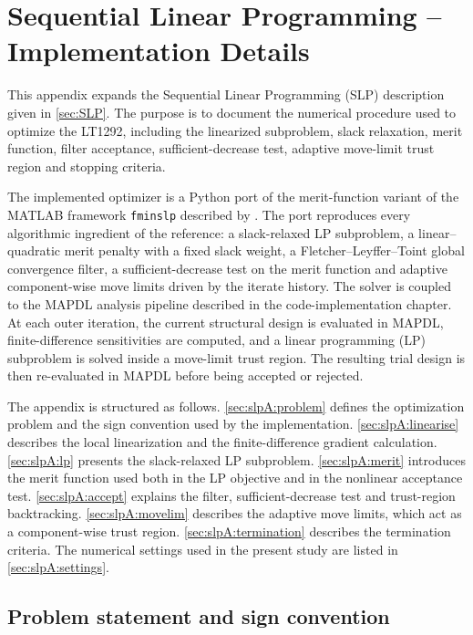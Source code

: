 \chapter{Sequential Linear Programming -- Implementation Details}
\label{sec:SLP_appendix}

This appendix expands the Sequential Linear Programming (SLP)
description given in \autoref{sec:SLP}. The purpose is to
document the numerical procedure used to optimize the LT1292,
including the linearized subproblem, slack relaxation, merit
function, filter acceptance, sufficient-decrease test, adaptive
move-limit trust region and stopping criteria.

The implemented optimizer is a Python port of the merit-function
variant of the MATLAB framework \texttt{fminslp} described by
\cite{sorensen2026fminslp}. The port reproduces every algorithmic
ingredient of the reference: a slack-relaxed LP subproblem, a
linear--quadratic merit penalty with a fixed slack weight, a
Fletcher--Leyffer--Toint global convergence filter, a
sufficient-decrease test on the merit function and adaptive
component-wise move limits driven by the iterate history. The
solver is coupled to the MAPDL analysis pipeline described in the
code-implementation chapter. At each outer iteration, the current
structural design is evaluated in MAPDL, finite-difference
sensitivities are computed, and a linear programming (LP)
subproblem is solved inside a move-limit trust region. The
resulting trial design is then re-evaluated in MAPDL before being
accepted or rejected.

The appendix is structured as follows. \autoref{sec:slpA:problem}
defines the optimization problem and the sign convention used by the
implementation. \autoref{sec:slpA:linearise} describes the local
linearization and the finite-difference gradient calculation.
\autoref{sec:slpA:lp} presents the slack-relaxed LP subproblem.
\autoref{sec:slpA:merit} introduces the merit function used both
in the LP objective and in the nonlinear acceptance test.
\autoref{sec:slpA:accept} explains the filter, sufficient-decrease
test and trust-region backtracking. \autoref{sec:slpA:movelim}
describes the adaptive move limits, which act as a component-wise
trust region. \autoref{sec:slpA:termination} describes the
termination criteria. The numerical settings used in the present
study are listed in \autoref{sec:slpA:settings}.

\section{Problem statement and sign convention}
\label{sec:slpA:problem}

